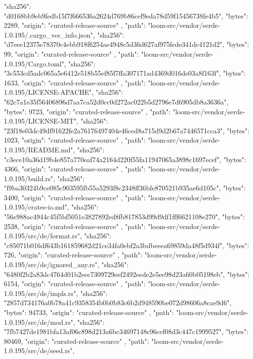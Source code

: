 {{      "sha256": "d0168bb9eb9fedb15f7f666536a2624d769b86cef9eda78d59f15456738fe4b5",
      "bytes": 2289,
      "origin": "curated-release-source"
    },
    {
      "path": "loom-src/vendor/serde-1.0.195/.cargo_vcs_info.json",
      "sha256": "d7eee12375e78370c4ebb918f6254ae4948c5d36d627af975fede341dc4121d2",
      "bytes": 99,
      "origin": "curated-release-source"
    },
    {
      "path": "loom-src/vendor/serde-1.0.195/Cargo.toml",
      "sha256": "3c553cd5adc065a5e6412e518b55ef85f7ffa307171ad4369d016de03a8f163f",
      "bytes": 1633,
      "origin": "curated-release-source"
    },
    {
      "path": "loom-src/vendor/serde-1.0.195/LICENSE-APACHE",
      "sha256": "62c7a1e35f56406896d7aa7ca52d0cc0d272ac022b5d2796e7d6905db8a3636a",
      "bytes": 9723,
      "origin": "curated-release-source"
    },
    {
      "path": "loom-src/vendor/serde-1.0.195/LICENSE-MIT",
      "sha256": "23f18e03dc49df91622fe2a76176497404e46ced8a715d9d2b67a7446571cca3",
      "bytes": 1023,
      "origin": "curated-release-source"
    },
    {
      "path": "loom-src/vendor/serde-1.0.195/README.md",
      "sha256": "c3ece10a36d19b4e857a770eaf74a2164d220f55fa11947065a3898c1697ecef",
      "bytes": 4366,
      "origin": "curated-release-source"
    },
    {
      "path": "loom-src/vendor/serde-1.0.195/build.rs",
      "sha256": "f9ba30324b9ce085c903595fb55a5293f8c2348ff36bfe870521b935ae6d105c",
      "bytes": 3400,
      "origin": "curated-release-source"
    },
    {
      "path": "loom-src/vendor/serde-1.0.195/crates-io.md",
      "sha256": "56e988ac4944c45f5bf5051e3827892ed8fb817853d99d9df1fff6621108e270",
      "bytes": 2538,
      "origin": "curated-release-source"
    },
    {
      "path": "loom-src/vendor/serde-1.0.195/src/de/format.rs",
      "sha256": "c85071b016df643b161859682d21ce34fa0ebf2a3bdbeeea69859da48f5d934f",
      "bytes": 726,
      "origin": "curated-release-source"
    },
    {
      "path": "loom-src/vendor/serde-1.0.195/src/de/ignored_any.rs",
      "sha256": "6480f2b2a83dc4764d01b2eec7309729eef2492eede2e5ee98d23a60b05198eb",
      "bytes": 6154,
      "origin": "curated-release-source"
    },
    {
      "path": "loom-src/vendor/serde-1.0.195/src/de/impls.rs",
      "sha256": "2857d734176a0b78a41c9358354b0b0b83c6b2d948590be072d98606a8cae9d6",
      "bytes": 94733,
      "origin": "curated-release-source"
    },
    {
      "path": "loom-src/vendor/serde-1.0.195/src/de/mod.rs",
      "sha256": "7fb7427de1981bfa13af06c898d213a6bc34697148e96cef08d3c447c1999527",
      "bytes": 80469,
      "origin": "curated-release-source"
    },
    {
      "path": "loom-src/vendor/serde-1.0.195/src/de/seed.rs",
}}
